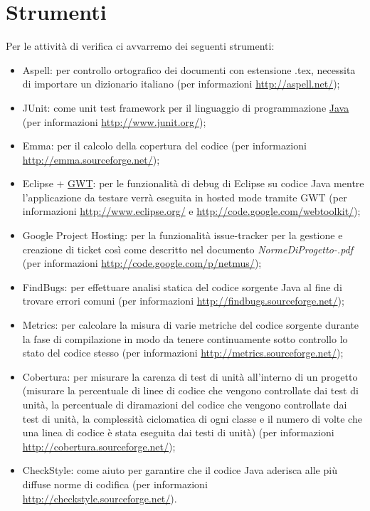 \section{Strumenti}

Per le attivit\`a di verifica ci avvarremo dei seguenti strumenti:

\begin{itemize}

\item Aspell: per controllo ortografico dei
documenti con estensione .tex, necessita di importare un dizionario italiano
(per informazioni \url{http://aspell.net/});

\item JUnit: come unit test framework per il linguaggio di
programmazione \underline{Java} (per informazioni
\url{http://www.junit.org/});

\item Emma: per il calcolo della copertura del codice (per informazioni
\url{http://emma.sourceforge.net/});

\item Eclipse + \underline{GWT}: per le funzionalit\`a di debug di Eclipse su
codice Java mentre l'applicazione da testare verr\`a eseguita in hosted mode
tramite GWT (per informazioni \url{http://www.eclipse.org/} e
\url{http://code.google.com/webtoolkit/});

\item Google Project Hosting: per la funzionalit\`a issue-tracker
per la gestione e creazione di ticket cos\`i come descritto nel documento
\emph{NormeDiProgetto-\versionenormeprogetto.pdf} (per informazioni
\url{http://code.google.com/p/netmus/});

\item FindBugs: per effettuare analisi statica del codice
sorgente Java al fine di trovare errori comuni (per informazioni
\url{http://findbugs.sourceforge.net/});

\item Metrics: per calcolare la misura di varie metriche del
codice sorgente durante la fase di compilazione in modo da tenere continuamente
sotto controllo lo stato del codice stesso (per informazioni
\url{http://metrics.sourceforge.net/});

\item Cobertura: per misurare la carenza di test di unit\`a
all'interno di un progetto (misurare la percentuale di linee di codice che
vengono controllate dai test di unit\`a, la percentuale di diramazioni del
codice che vengono controllate dai test di unit\`a, la complessit\`a ciclomatica
di ogni classe e il numero di volte che una linea di codice \`e stata eseguita
dai testi di unit\`a) (per informazioni \url{http://cobertura.sourceforge.net/});

\item CheckStyle: come aiuto per garantire che il codice Java
aderisca alle pi\`u diffuse norme di codifica (per informazioni
\url{http://checkstyle.sourceforge.net/}).
\end{itemize}


